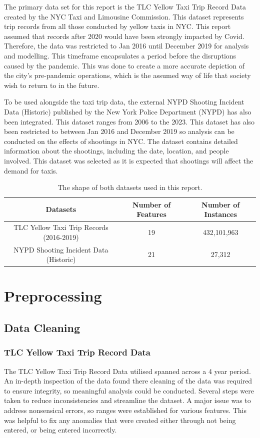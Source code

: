 \documentclass[11pt]{article}
\begin{document}
\hspace{0pt}The primary data set for this report is the TLC Yellow Taxi Trip Record Data created by the NYC Taxi and Limousine Commission. This dataset represents trip records from all those conducted by yellow taxis in NYC. This report assumed that records after 2020 would have been strongly impacted by Covid. Therefore, the data was restricted to Jan 2016 until December 2019 for analysis and modelling. This timeframe encapsulates a period before the disruptions caused by the pandemic. This was done to create a more accurate depiction of the city’s pre-pandemic operations, which is the assumed way of life that society wish to return to in the future.

\clearpage

To be used alongside the taxi trip data, the external NYPD Shooting Incident Data (Historic) published by the New York Police Department (NYPD) has also been integrated. This dataset ranges from 2006 to the 2023. This dataset has also been restricted to between Jan 2016 and December 2019 so analysis can be conducted on the effects of shootings in NYC. The dataset contains detailed information about the shootings, including the date, location, and people involved. This dataset was selected as it is expected that shootings will affect the demand for taxis. 

\begin{table}[htbp]
\centering
\begin{tabular}{|c|c|c|}
\hline
\textbf{Datasets} & \textbf{Number of Features} & \textbf{Number of Instances} \\
\hline
TLC Yellow Taxi Trip Records (2016-2019) & 19 & 432,101,963 \\
NYPD Shooting Incident Data (Historic) & 21 & 27,312 \\
\hline
\end{tabular}
\caption{The shape of both datasets used in this report.}
\end{table}

\section{Preprocessing}
\subsection{Data Cleaning}
\subsubsection{TLC Yellow Taxi Trip Record Data}
\hspace{0pt}The TLC Yellow Taxi Trip Record Data utilised spanned across a 4 year period. An in-depth inspection of the data found there cleaning of the data was required to ensure integrity, so meaningful analysis could be conducted. Several steps were taken to reduce inconsistencies and streamline the dataset. A major issue was to address nonsensical errors, so ranges were established for various features. This was helpful to fix any anomalies that were created either through not being entered, or being entered incorrectly. 
\end{document}
